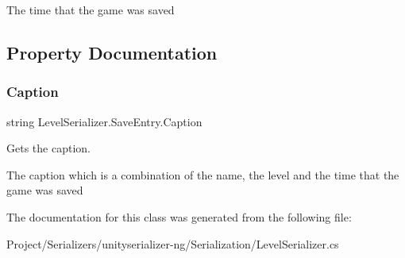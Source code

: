 The time that the game was saved 



\subsection{Property Documentation}
\mbox{\label{class_level_serializer_1_1_save_entry_a0a41b3b1fd07cf3eddc2262ee569a7e5}} 
\subsubsection{\texorpdfstring{Caption}{Caption}}
{\footnotesize\ttfamily string Level\+Serializer.\+Save\+Entry.\+Caption\hspace{0.3cm}{\ttfamily [get]}}



Gets the caption. 

The caption which is a combination of the name, the level and the time that the game was saved 

The documentation for this class was generated from the following file\+:\begin{DoxyCompactItemize}
\item 
Project/\+Serializers/unityserializer-\/ng/\+Serialization/Level\+Serializer.\+cs\end{DoxyCompactItemize}
